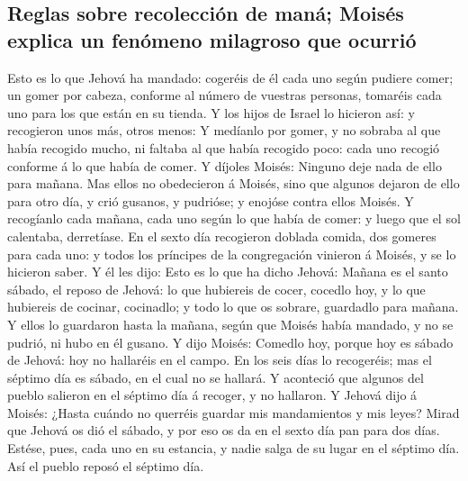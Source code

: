 \hypertarget{reglas-sobre-recolecciuxf3n-de-manuxe1-moisuxe9s-explica-un-fenuxf3meno-milagroso-que-ocurriuxf3}{%
\subsection{Reglas sobre recolección de maná; Moisés explica un fenómeno
milagroso que
ocurrió}\label{reglas-sobre-recolecciuxf3n-de-manuxe1-moisuxe9s-explica-un-fenuxf3meno-milagroso-que-ocurriuxf3}}

 Esto es lo que Jehová ha mandado: cogeréis de él cada
uno según pudiere comer; un gomer por cabeza, conforme al número de
vuestras personas, tomaréis cada uno para los que están en su tienda.
 Y los hijos de Israel lo hicieron así: y recogieron unos
más, otros menos:  Y medíanlo por gomer, y no sobraba al
que había recogido mucho, ni faltaba al que había recogido poco: cada
uno recogió conforme á lo que había de comer.  Y díjoles
Moisés: Ninguno deje nada de ello para mañana.  Mas ellos
no obedecieron á Moisés, sino que algunos dejaron de ello para otro día,
y crió gusanos, y pudrióse; y enojóse contra ellos Moisés.
 Y recogíanlo cada mañana, cada uno según lo que había de
comer: y luego que el sol calentaba, derretíase.  En el
sexto día recogieron doblada comida, dos gomeres para cada uno: y todos
los príncipes de la congregación vinieron á Moisés, y se lo hicieron
saber.  Y él les dijo: Esto es lo que ha dicho Jehová:
Mañana es el santo sábado, el reposo de Jehová: lo que hubiereis de
cocer, cocedlo hoy, y lo que hubiereis de cocinar, cocinadlo; y todo lo
que os sobrare, guardadlo para mañana.  Y ellos lo
guardaron hasta la mañana, según que Moisés había mandado, y no se
pudrió, ni hubo en él gusano.  Y dijo Moisés: Comedlo
hoy, porque hoy es sábado de Jehová: hoy no hallaréis en el campo.
 En los seis días lo recogeréis; mas el séptimo día es
sábado, en el cual no se hallará.  Y aconteció que
algunos del pueblo salieron en el séptimo día á recoger, y no hallaron.
 Y Jehová dijo á Moisés: ¿Hasta cuándo no querréis
guardar mis mandamientos y mis leyes?  Mirad que Jehová
os dió el sábado, y por eso os da en el sexto día pan para dos días.
Estése, pues, cada uno en su estancia, y nadie salga de su lugar en el
séptimo día.  Así el pueblo reposó el séptimo día.


